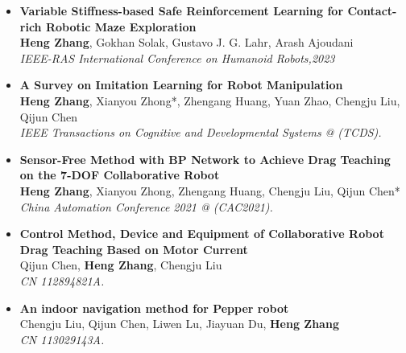 \documentclass{resume}
\begin{document}
\begin{itemize}
\item \textbf{Variable Stiffness-based Safe Reinforcement Learning for Contact-rich Robotic Maze Exploration} \\
  \footnotesize{\textbf{Heng Zhang}, Gokhan Solak, Gustavo J. G. Lahr, Arash Ajoudani} \\
  \footnotesize{\textit{ IEEE-RAS International Conference on Humanoid Robots,2023}}

\item \textbf{A Survey on Imitation Learning for Robot Manipulation} \\
  \footnotesize{\textbf{Heng Zhang}, Xianyou Zhong*, Zhengang Huang, Yuan Zhao, Chengju Liu, Qijun Chen} \\
  \footnotesize{\textit{ IEEE Transactions on Cognitive and Developmental Systems @ (TCDS).}}
   
\item \textbf{Sensor-Free Method with BP Network to Achieve Drag Teaching on the 7-DOF Collaborative Robot} \quad [accepted]\\
  \footnotesize{\textbf{Heng Zhang}, Xianyou Zhong, Zhengang Huang, Chengju Liu, Qijun Chen*} \\
  \footnotesize{\textit{ China Automation Conference 2021 @ (CAC2021).}}

\item \textbf{Control Method, Device and Equipment of Collaborative Robot Drag Teaching Based on Motor Current}\quad {}\\
  \footnotesize{Qijun Chen, \textbf{Heng Zhang}, Chengju Liu}\\
  \footnotesize{\textit{ CN 112894821A.}}
  
\item \textbf{An indoor navigation method for Pepper robot}\quad {}\\
  \footnotesize{Chengju Liu, Qijun Chen, Liwen Lu, Jiayuan Du, \textbf{Heng Zhang}}\\
  \footnotesize{\textit{ CN 113029143A.}} 
  

\end{itemize}
\end{document}
